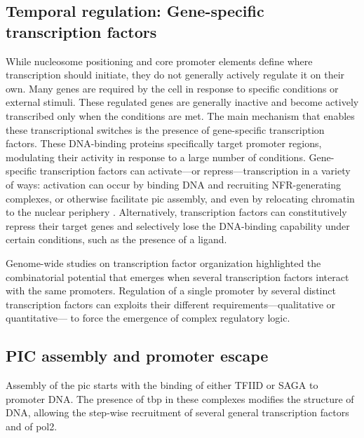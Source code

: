 \subsection{Temporal regulation: Gene-specific transcription factors}
While nucleosome positioning and core promoter elements define where transcription should initiate, they do not generally actively regulate it on their own.  
Many genes are required by the cell in response to specific conditions or external stimuli.
These regulated genes are generally inactive and become actively transcribed only when the conditions are met.
The main mechanism that enables these transcriptional switches is the presence of gene-specific transcription factors.
These DNA-binding proteins specifically target promoter regions, modulating their activity in response to a large number of conditions.
Gene-specific transcription factors can activate---or repress---transcription in a variety of ways: activation can occur by binding DNA and recruiting NFR-generating complexes, or otherwise facilitate \gls{pic} assembly, and even by relocating chromatin to the nuclear periphery .
Alternatively, transcription factors can constitutively repress their target genes and selectively lose the DNA-binding capability under certain conditions, such as the presence of a ligand.

Genome-wide studies on transcription factor organization highlighted the combinatorial potential that emerges when several transcription factors interact with the same promoters\cite{harbison:2004:transcriptional}.
Regulation of a single promoter by several distinct transcription factors can exploits their different requirements---qualitative or quantitative--- to force the emergence of complex regulatory logic.

\subsection{PIC assembly and promoter escape}
Assembly of the \acrfull{pic} starts with the binding of either TFIID or SAGA to promoter DNA.
The presence of \gls{tbp} in these complexes modifies the structure of DNA, allowing the step-wise recruitment of several general transcription factors and of \gls{pol2}.

